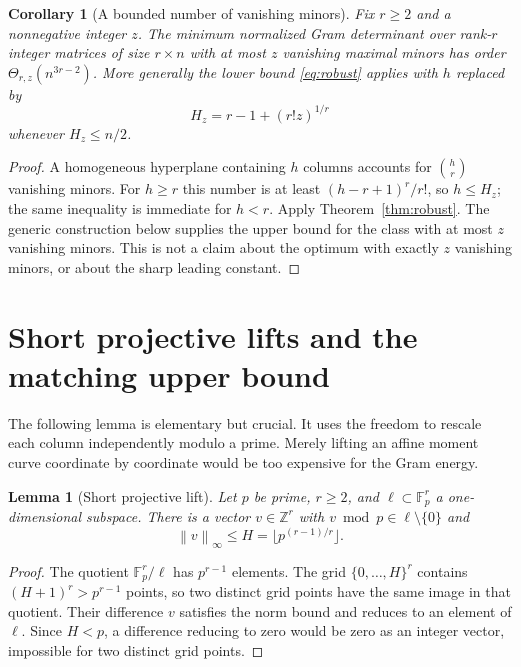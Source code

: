 \documentclass[11pt]{article}
\newtheorem{lemma}[theorem]{Lemma}
\newtheorem{corollary}[theorem]{Corollary}
\theoremstyle{remark}\newtheorem{remark}[theorem]{Remark}
\newcommand{\Z}{\mathbb Z}\newcommand{\R}{\mathbb R}\newcommand{\F}{\mathbb F}
\newcommand{\norm}[1]{\left\lVert #1\right\rVert}
\begin{document}
\begin{corollary}[A bounded number of vanishing minors]\label{cor:zeros}
Fix $r\ge2$ and a nonnegative integer $z$. The minimum normalized Gram determinant over rank-$r$ integer matrices of size $r\times n$ with \emph{at most} $z$ vanishing maximal minors has order $\Theta_{r,z}(n^{3r-2})$. More generally the lower bound \eqref{eq:robust} applies with $h$ replaced by
\[
 H_z=r-1+(r!z)^{1/r}
\]
whenever $H_z\le n/2$.
\end{corollary}
\begin{proof}
A homogeneous hyperplane containing $h$ columns accounts for $\binom hr$ vanishing minors. For $h\ge r$ this number is at least $(h-r+1)^r/r!$, so $h\le H_z$; the same inequality is immediate for $h<r$. Apply Theorem~\ref{thm:robust}. The generic construction below supplies the upper bound for the class with at most $z$ vanishing minors. This is not a claim about the optimum with exactly $z$ vanishing minors, or about the sharp leading constant.
\end{proof}

\section{Short projective lifts and the matching upper bound}
The following lemma is elementary but crucial. It uses the freedom to rescale each column independently modulo a prime. Merely lifting an affine moment curve coordinate by coordinate would be too expensive for the Gram energy.

\begin{lemma}[Short projective lift]\label{lem:lift}
Let $p$ be prime, $r\ge2$, and $\ell\subset\F_p^r$ a one-dimensional subspace. There is a vector $v\in\Z^r$ with $v\bmod p\in\ell\setminus\{0\}$ and
\[
 \norm v_\infty\le H=\lfloor p^{(r-1)/r}\rfloor.
\]
\end{lemma}
\begin{proof}
The quotient $\F_p^r/\ell$ has $p^{r-1}$ elements. The grid $\{0,\ldots,H\}^r$ contains $(H+1)^r>p^{r-1}$ points, so two distinct grid points have the same image in that quotient. Their difference $v$ satisfies the norm bound and reduces to an element of $\ell$. Since $H<p$, a difference reducing to zero would be zero as an integer vector, impossible for two distinct grid points.
\end{proof}
\end{document}
